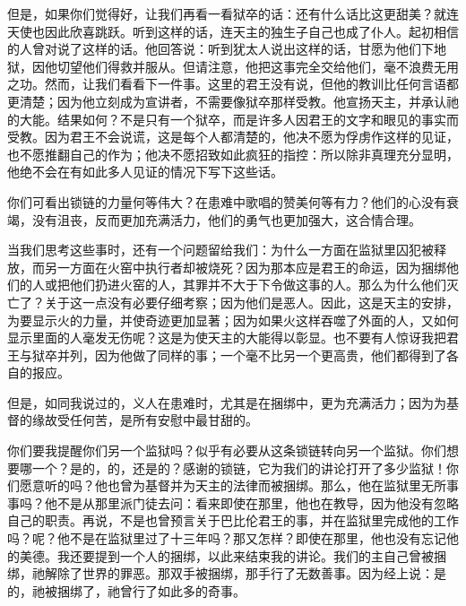 但是，如果你们觉得好，让我们再看一看狱卒的话：还有什么话比这更甜美？就连天使也因此欣喜跳跃。听到这样的话，连天主的独生子自己也成了仆人。起初相信的人曾对说了这样的话。他回答说：听到犹太人说出这样的话，甘愿为他们下地狱，因他切望他们得救并服从。但请注意，他把这事完全交给他们，毫不浪费无用之功。然而，让我们看看下一件事。这里的君王没有说，但他的教训比任何言语都更清楚；因为他立刻成为宣讲者，不需要像狱卒那样受教。他宣扬天主，并承认祂的大能。结果如何？不是只有一个狱卒，而是许多人因君王的文字和眼见的事实而受教。因为君王不会说谎，这是每个人都清楚的，他决不愿为俘虏作这样的见证，也不愿推翻自己的作为；他决不愿招致如此疯狂的指控：所以除非真理充分显明，他绝不会在有如此多人见证的情况下写下这些话。\par

你们可看出锁链的力量何等伟大？在患难中歌唱的赞美何等有力？他们的心没有衰竭，没有沮丧，反而更加充满活力，他们的勇气也更加强大，这合情合理。\par

当我们思考这些事时，还有一个问题留给我们：为什么一方面在监狱里囚犯被释放，而另一方面在火窑中执行者却被烧死？因为那本应是君王的命运，因为捆绑他们的人或把他们扔进火窑的人，其罪并不大于下令做这事的人。那么为什么他们灭亡了？关于这一点没有必要仔细考察；因为他们是恶人。因此，这是天主的安排，为要显示火的力量，并使奇迹更加显著；因为如果火这样吞噬了外面的人，又如何显示里面的人毫发无伤呢？这是为使天主的大能得以彰显。也不要有人惊讶我把君王与狱卒并列，因为他做了同样的事；一个毫不比另一个更高贵，他们都得到了各自的报应。\par

但是，如同我说过的，义人在患难时，尤其是在捆绑中，更为充满活力；因为为基督的缘故受任何苦，是所有安慰中最甘甜的。\par

你们要我提醒你们另一个监狱吗？似乎有必要从这条锁链转向另一个监狱。你们想要哪一个？是的，的，还是的？感谢的锁链，它为我们的讲论打开了多少监狱！你们愿意听的吗？他也曾为基督并为天主的法律而被捆绑。那么，他在监狱里无所事事吗？他不是从那里派门徒去问：看来即使在那里，他也在教导，因为他没有忽略自己的职责。再说，不是也曾预言关于巴比伦君王的事，并在监狱里完成他的工作吗？呢？他不是在监狱里过了十三年吗？那又怎样？即使在那里，他也没有忘记他的美德。我还要提到一个人的捆绑，以此来结束我的讲论。我们的主自己曾被捆绑，祂解除了世界的罪恶。那双手被捆绑，那手行了无数善事。因为经上说：是的，祂被捆绑了，祂曾行了如此多的奇事。\par

